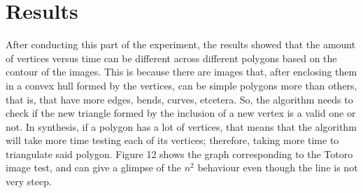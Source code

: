 \documentclass[conference]{IEEEtran}
\begin{document}
\section{Results}
After conducting this part of the experiment, the results showed that the amount of vertices versus time can be different across different polygons based on the contour of the images. This is because there are images that, after enclosing them in a convex hull formed by the vertices, can be simple polygons more than others, that is, that have more edges, bends, curves, etcetera. So, the algorithm needs to check if the new triangle formed by the inclusion of a new vertex is a valid one or not. In synthesis, if a polygon has a lot of vertices, that means that the algorithm will take more time testing each of its vertices; therefore, taking more time to triangulate said polygon. Figure 12 shows the graph corresponding to the Totoro image test, and can give a glimpse of the $n^2$ behaviour even though the line is not very steep.
\end{document}
